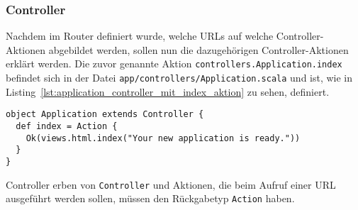 

\subsubsection{Controller} %
\label{ssub:controller}

Nachdem im Router definiert wurde, welche URLs auf welche Controller-Aktionen abgebildet werden, sollen nun die dazugehörigen Controller-Aktionen erklärt werden.
Die zuvor genannte Aktion \lstinline[breaklines=true]|controllers.Application.index| befindet sich in der Datei \lstinline[breaklines=true]|app/controllers/Application.scala| und ist, wie in Listing~\ref{lst:application_controller_mit_index_aktion} zu sehen, definiert.

\begin{lstlisting}[caption=Der Application-Controller mit index-Aktion, label=lst:application_controller_mit_index_aktion]
object Application extends Controller {
  def index = Action {
    Ok(views.html.index("Your new application is ready."))
  }
}
\end{lstlisting}

Controller erben von \lstinline|Controller| und Aktionen, die beim Aufruf einer URL ausgeführt werden sollen, müssen den Rückgabetyp \lstinline|Action| haben. 





